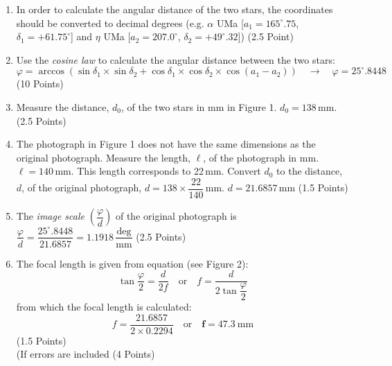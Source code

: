 \begin{enumerate}
\item In order to calculate the angular distance of the two stars, the
coordinates should be converted to decimal degrees (e.g. $\alpha$ UMa
[$a_1 = 165^\circ.75$, $\delta_1 = +61.75^\circ$] and $\eta$ UMa
[$a_2 = 207.0^\circ$, $\delta_2 = +49^\circ.32$]) \hfill(2.5 Point)

\item Use the \emph{cosine law} to calculate the angular distance between
the two stars:
\[ \varphi = \arccos(\sin\delta_1 \times \sin\delta_2
   + \cos\delta_1 \times \cos\delta_2 \times \cos(a_1 - a_2))
   \quad\rightarrow\quad \varphi = 25^\circ.8448 \]
\hfill(10 Points)

\item Measure the distance, $d_0$, of the two stars in mm in Figure 1.
$d_0 = 138$\,mm. \hfill(2.5 Points)

\item The photograph in Figure 1 does not have the same dimensions as the
original photograph. Measure the length, $\ell$, of the photograph in mm.
$\ell = 140$\,mm. This length corresponds to 22\,mm. Convert $d_0$ to the
distance, $d$, of the original photograph,
$d = 138 \times \dfrac{22}{140}$\,mm. $d = 21.6857$\,mm \hfill(1.5 Points)

\item %
The \emph{image scale} $\left(\dfrac{\varphi}{d}\right)$ of the original
photograph is
$\dfrac{\varphi}{d} = \dfrac{25^\circ.8448}{21.6857}
 = 1.1918\,\dfrac{\mathrm{deg}}{\mathrm{mm}}$ \hfill(2.5 Points)

\item The focal length is given from equation (see Figure 2):
\[ \tan\frac{\varphi}{2} = \frac{d}{2f}
   \quad\text{or}\quad
   f = \frac{d}{2\tan\dfrac{\varphi}{2}} \]
from which the focal length is calculated:
\[ f = \frac{21.6857}{2 \times 0.2294}
   \quad\text{or}\quad
   \mathbf{f = 47.3\ \mathrm{mm}} \]
\hfill(1.5 Points)\\
(If errors are included \hfill(4 Points)
\end{enumerate}

